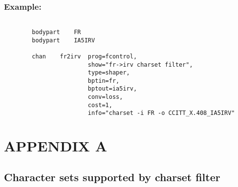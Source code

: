 \bigskip\bigskip\noindent
\subsubsection {Example:}

\begin{verbatim}

        bodypart	FR
        bodypart	IA5IRV

        chan	fr2irv	prog=fcontrol,
                        show="fr->irv charset filter",
                        type=shaper,
                        bptin=fr,
                        bptout=ia5irv,
                        conv=loss,
                        cost=1,
                        info="charset -i FR -o CCITT_X.408_IA5IRV"
\end{verbatim}


\clearpage
\section {APPENDIX A}
\bigskip
\subsection {Character sets supported by charset filter}
\bigskip\medskip\noindent


